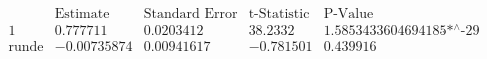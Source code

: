 \[\begin{array}{l|llll}
 \text{} & \text{Estimate} & \text{Standard Error} & \text{t-Statistic} & \text{P-Value} \\
\hline
 1 & 0.777711 & 0.0203412 & 38.2332 & \text{1.5853433604694185$\grave{ }$*${}^{\wedge}$-29} \\
 \text{runde} & -0.00735874 & 0.00941617 & -0.781501 & 0.439916 \\
\end{array}\]

